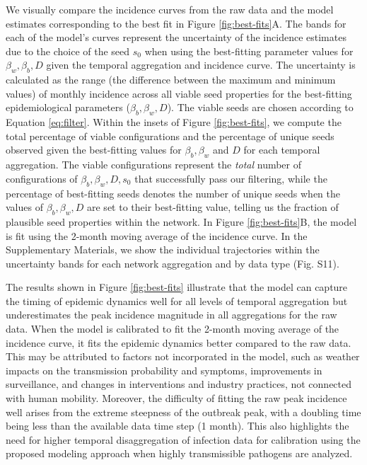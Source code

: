 \documentclass[aps,physrev,reprint,superscriptaddress]{revtex4-1}
\begin{document}
 We visually compare the incidence curves from the raw data and the model estimates corresponding to the best fit in Figure \ref{fig:best-fits}A. The bands for each of the model's curves represent the uncertainty of the incidence estimates due to the choice of the seed $s_0$ when using the best-fitting parameter values for $\beta_w,\beta_b,D$ given the temporal aggregation and incidence curve. The uncertainty is calculated as the range (the difference between the maximum and minimum values) of monthly incidence across all viable seed properties for the best-fitting epidemiological parameters ($\beta_b,\beta_w, D$). The viable seeds are chosen according to Equation \ref{eq:filter}.  Within the insets of Figure \ref{fig:best-fits}, we compute the total percentage of viable configurations and the percentage of unique seeds observed given the best-fitting values for $\beta_b,\beta_w$ and $D$ for each temporal aggregation.  The viable configurations represent the \textit{total} number of configurations of $\beta_b,\beta_w, D, s_0$ that successfully pass our filtering, while the percentage of best-fitting seeds denotes the number of unique seeds when the values of $\beta_b,\beta_w, D$ are set to their best-fitting value, telling us the fraction of plausible seed properties within the network. In Figure \ref{fig:best-fits}B, the model is fit using the 2-month moving average of the incidence curve. In the Supplementary Materials, we show the individual trajectories within the uncertainty bands for each network aggregation and by data type (Fig. S11).


The results shown in Figure \ref{fig:best-fits} illustrate that the model can capture the timing of epidemic dynamics well for all levels of temporal aggregation but underestimates the peak incidence magnitude in all aggregations for the raw data. When the model is calibrated to fit the 2-month moving average of the incidence curve, it fits the epidemic dynamics better compared to the raw data. This may be attributed to factors not incorporated in the model, such as weather impacts on the transmission probability and symptoms, improvements in surveillance, and changes in interventions and industry practices, not connected with human mobility. Moreover, the difficulty of fitting the raw peak incidence well arises from the extreme steepness of the outbreak peak, with a doubling time being less than the available data time step (1 month). This also highlights the need for higher temporal disaggregation of infection data for calibration using the proposed modeling approach when highly transmissible pathogens are analyzed. 
\end{document}
